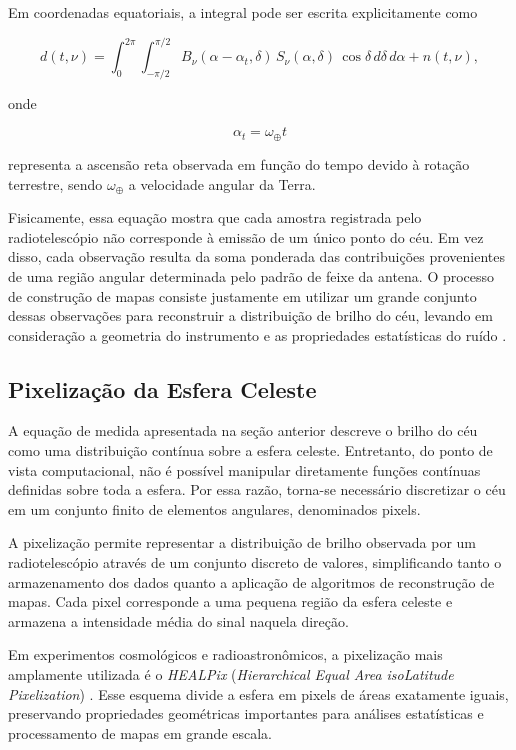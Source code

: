 Em coordenadas equatoriais, a integral pode ser escrita explicitamente como

\begin{equation}
d(t,\nu)=
\int_0^{2\pi}
\int_{-\pi/2}^{\pi/2}
B_\nu(\alpha-\alpha_t,\delta)\,
S_\nu(\alpha,\delta)\,
\cos\delta\,
d\delta\,d\alpha
+
n(t,\nu),
\end{equation}

onde

\begin{equation}
\alpha_t=\omega_\oplus t
\end{equation}

representa a ascensão reta observada em função do tempo devido à rotação terrestre, sendo \(\omega_\oplus\) a velocidade angular da Terra.

Fisicamente, essa equação mostra que cada amostra registrada pelo radiotelescópio não corresponde à emissão de um único ponto do céu. Em vez disso, cada observação resulta da soma ponderada das contribuições provenientes de uma região angular determinada pelo padrão de feixe da antena. O processo de construção de mapas consiste justamente em utilizar um grande conjunto dessas observações para reconstruir a distribuição de brilho do céu, levando em consideração a geometria do instrumento e as propriedades estatísticas do ruído \cite{tegmark1997mapmaking}.

\subsection{Pixelização da Esfera Celeste}

A equação de medida apresentada na seção anterior descreve o brilho do céu como uma distribuição contínua sobre a esfera celeste. Entretanto, do ponto de vista computacional, não é possível manipular diretamente funções contínuas definidas sobre toda a esfera. Por essa razão, torna-se necessário discretizar o céu em um conjunto finito de elementos angulares, denominados pixels.

A pixelização permite representar a distribuição de brilho observada por um radiotelescópio através de um conjunto discreto de valores, simplificando tanto o armazenamento dos dados quanto a aplicação de algoritmos de reconstrução de mapas. Cada pixel corresponde a uma pequena região da esfera celeste e armazena a intensidade média do sinal naquela direção.

Em experimentos cosmológicos e radioastronômicos, a pixelização mais amplamente utilizada é o \textit{HEALPix} (\textit{Hierarchical Equal Area isoLatitude Pixelization}) \cite{gorski2005healpix}. Esse esquema divide a esfera em pixels de áreas exatamente iguais, preservando propriedades geométricas importantes para análises estatísticas e processamento de mapas em grande escala.

